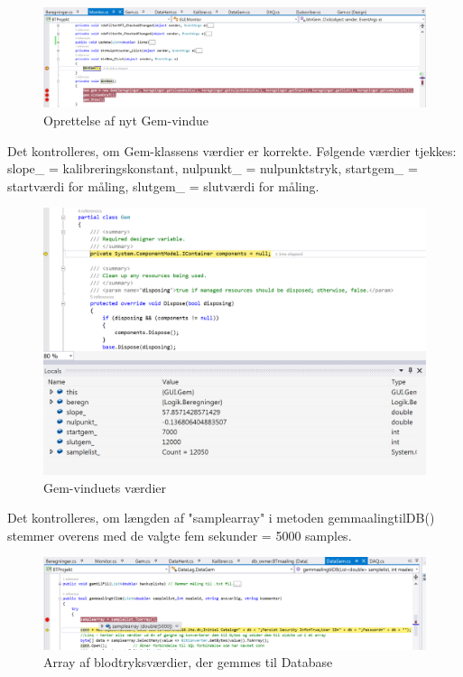 \begin{figure}[H]
	\centering
	\includegraphics[width=1\textwidth]{Figurer/UC6_BtnGem}
	\caption{Oprettelse af nyt Gem-vindue}
\end{figure}

Det kontrolleres, om Gem-klassens værdier er korrekte. Følgende værdier tjekkes: slope\_ = kalibreringskonstant, nulpunkt\_ = nulpunktstryk, startgem\_ = startværdi for måling, slutgem\_ = slutværdi for måling.

\begin{figure}[H]
	\centering
	\includegraphics[width=1\textwidth]{Figurer/UC6_Vardier}
	\caption{Gem-vinduets værdier}
\end{figure}

Det kontrolleres, om længden af "samplearray" i metoden gemmaalingtilDB() stemmer overens med de valgte fem sekunder = 5000 samples.

\begin{figure}[H]
	\centering
	\includegraphics[width=1\textwidth]{Figurer/UC6_Samplearray}
	\caption{Array af blodtryksværdier, der gemmes til Database}
\end{figure}

